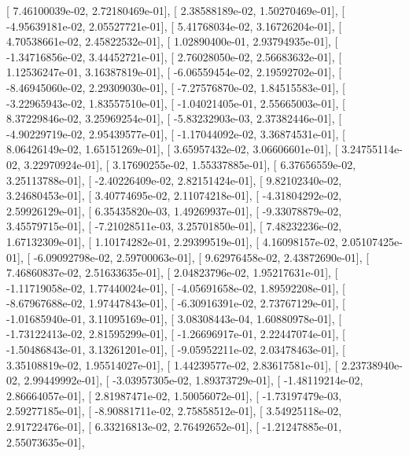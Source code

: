 \documentclass{article}
\begin{document}
       [  7.46100039e-02,   2.72180469e-01],
       [  2.38588189e-02,   1.50270469e-01],
       [ -4.95639181e-02,   2.05527721e-01],
       [  5.41768034e-02,   3.16726204e-01],
       [  4.70538661e-02,   2.45822532e-01],
       [  1.02890400e-01,   2.93794935e-01],
       [ -1.34716856e-02,   3.44452721e-01],
       [  2.76028050e-02,   2.56683632e-01],
       [  1.12536247e-01,   3.16387819e-01],
       [ -6.06559454e-02,   2.19592702e-01],
       [ -8.46945060e-02,   2.29309030e-01],
       [ -7.27576870e-02,   1.84515583e-01],
       [ -3.22965943e-02,   1.83557510e-01],
       [ -1.04021405e-01,   2.55665003e-01],
       [  8.37229846e-02,   3.25969254e-01],
       [ -5.83232903e-03,   2.37382446e-01],
       [ -4.90229719e-02,   2.95439577e-01],
       [ -1.17044092e-02,   3.36874531e-01],
       [  8.06426149e-02,   1.65151269e-01],
       [  3.65957432e-02,   3.06606601e-01],
       [  3.24755114e-02,   3.22970924e-01],
       [  3.17690255e-02,   1.55337885e-01],
       [  6.37656559e-02,   3.25113788e-01],
       [ -2.40226409e-02,   2.82151424e-01],
       [  9.82102340e-02,   3.24680453e-01],
       [  3.40774695e-02,   2.11074218e-01],
       [ -4.31804292e-02,   2.59926129e-01],
       [  6.35435820e-03,   1.49269937e-01],
       [ -9.33078879e-02,   3.45579715e-01],
       [ -7.21028511e-03,   3.25701850e-01],
       [  7.48232236e-02,   1.67132309e-01],
       [  1.10174282e-01,   2.29399519e-01],
       [  4.16098157e-02,   2.05107425e-01],
       [ -6.09092798e-02,   2.59700063e-01],
       [  9.62976458e-02,   2.43872690e-01],
       [  7.46860837e-02,   2.51633635e-01],
       [  2.04823796e-02,   1.95217631e-01],
       [ -1.11719058e-02,   1.77440024e-01],
       [ -4.05691658e-02,   1.89592208e-01],
       [ -8.67967688e-02,   1.97447843e-01],
       [ -6.30916391e-02,   2.73767129e-01],
       [ -1.01685940e-01,   3.11095169e-01],
       [  3.08308443e-04,   1.60880978e-01],
       [ -1.73122413e-02,   2.81595299e-01],
       [ -1.26696917e-01,   2.22447074e-01],
       [ -1.50486843e-01,   3.13261201e-01],
       [ -9.05952211e-02,   2.03478463e-01],
       [  3.35108819e-02,   1.95514027e-01],
       [  1.44239577e-02,   2.83617581e-01],
       [  2.23738940e-02,   2.99449992e-01],
       [ -3.03957305e-02,   1.89373729e-01],
       [ -1.48119214e-02,   2.86664057e-01],
       [  2.81987471e-02,   1.50056072e-01],
       [ -1.73197479e-03,   2.59277185e-01],
       [ -8.90881711e-02,   2.75858512e-01],
       [  3.54925118e-02,   2.91722476e-01],
       [  6.33216813e-02,   2.76492652e-01],
       [ -1.21247885e-01,   2.55073635e-01],
\end{document}
